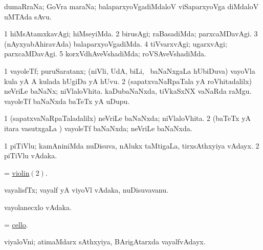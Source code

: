 \bentry
{}
\gl{\nA}
\expl{}
\bmng
 dumaRraNa; GoVra maraNa; balaparxyoVgadiMdaloV viSaparxyoVga diMdaloV uMTAda sAvu. 
\emng
\eentry

\bentry
{} 
\gl{\kirxvi}
\expl{}
\bmng
\bnum
\num{1} hiMsAtamxkavAgi; hiMseyiMda. 
\num{2} birusAgi; raBasadiMda; parxcaMDavAgi. 
\num{3} (nAyxyabAhiravAda) balaparxyoVgadiMda. 
\num{4} tiVvarxvAgi; ugarxvAgi; parxcaMDavAgi. 
\num{5} korxVdhAveVshadiMda; roVSAveVshadiMda. 
\enum
\emng
\eentry

\bentry
{} 
\gl{\nA}
\expl{}
\bmng
\bnum
\num{1} vayoleTf; puruSaratanx; (niVli, UdA, biLi, \mo\ baNaNxgaLa hUbiDuva) vayoVla kula yA A kulada hUgiDa yA hUvu. 
\num{2} (sapatxvaNaRpaTala yA roVhitadalilx) neVriLe baNaNx; niVlaloVhita. 
\banum
{} kaDubaNaNxda, tiVkaSxNX vaNaRda raMgu. 
 vayoleTf baNaNxda baTeTx yA uDupu. 
\eanum
\numie
\enum
\emng
\eentry

\bentry
{} 
\gl{\gu}
\expl{}
\bmng
\bnum
\num{1} (sapatxvaNaRpaTaladalilx) neVriLe baNaNxda; niVlaloVhita. 
\num{2} (baTeTx yA itara vasutxgaLa \vi) vayoleTf baNaNxda; neVriLe baNaNxda. 
\enum
\emng
\eentry

\bentry
{} 
\gl{\nA}
\expl{}
\bmng
\bnum
\num{1} piTiVlu; kamAniniMda nuDisuva, nAlukx taMtigaLa, tirxsAthxyiya vAdayx.  
\hypertarget{violin(2)}{} 
\num{2} piTiVlu vAdaka. 
\enum
\emng
\eentry

\bentry
{} 
\gl{\nA}
\expl{}
\bmng
 = \hyperlink{violin(2)}{violin\((2)\)}. 
\emng
\eentry

\bentry 
{} 
\gl{\nA}
\expl{}
\bmng
 vayalisfTx; vayalf  yA viyoVl vAdaka, nuDisuvavanu. 
\emng
\eentry

\bentry
{} 
\gl{\nA}
\expl{}
\bmng
 vayolanecxlo vAdaka. 
\emng
\eentry

\bentry
{} 
\gl{\nA}
\bmng
 = \hyperref{kandict_c.pdf}{C}{cello}{cello}. 
\emng
\eentry

\bentry
{} 
\gl{\nA}
\expl{}
\bmng
 viyaloVni; atimaMdarx sAthxyiya, BArigAtarxda vayalfvAdayx. 
\emng
\eentry

